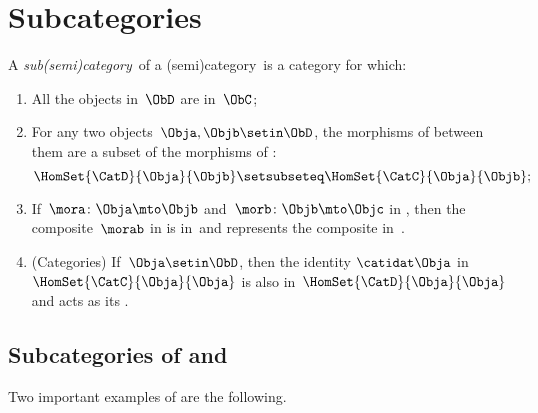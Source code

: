 
\section{Subcategories}
\label{sec:subcategories}


\begin{ctdefinition}[Subcategory]
    \label{def:subcategory}
    A \emph{sub(semi)category}~\CatD of a (semi)category~\CatC is a category for which:
    \begin{enumerate}
        \item All the objects in~$\ObD$ are in~$\ObC$;
        \item For any two objects~$\Obja,\Objb\setin \ObD$,
              the morphisms of \CatD between them are a subset of the morphisms of \CatC:
              \begin{equation}
                  \HomSet{\CatD}{\Obja}{\Objb}\setsubseteq \HomSet{\CatC}{ \Obja}{\Objb};
              \end{equation}
        \item If~$\mora \colon \Obja \mto \Objb$ and~$\morb\colon \Objb\mto \Objc$ in \CatD, then the composite~$\morab$ in \CatC is in~\CatD and represents the composite in~\CatD.
        \item (Categories) If~$\Obja\setin \ObD$, then the identity $\catidat\Obja$ in $\HomSet{\CatC}{\Obja}{\Obja}$ is also in~$\HomSet{\CatD}{\Obja}{\Obja}$ and acts as its .
    \end{enumerate}
\end{ctdefinition}

\subsection{Subcategories of \Rel and \Set}

Two important examples of  are the following.

